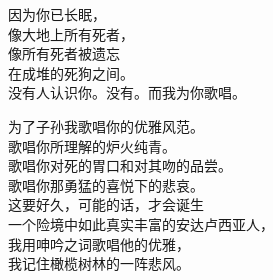 \documentclass{article}
\begin{document}
\begin{center}
\begin{minipage}{0.5\linewidth}
因为你已长眠， \\
像大地上所有死者， \\
像所有死者被遗忘 \\
在成堆的死狗之间。 \\

没有人认识你。没有。而我为你歌唱。 \\

\end{minipage}

\newpage

\begin{minipage}{0.5\linewidth}

\Large

为了子孙我歌唱你的优雅风范。 \\
歌唱你所理解的炉火纯青。 \\
歌唱你对死的胃口和对其吻的品尝。 \\
歌唱你那勇猛的喜悦下的悲哀。 \\

这要好久，可能的话，才会诞生 \\
一个险境中如此真实丰富的安达卢西亚人， \\
我用呻吟之词歌唱他的优雅， \\
我记住橄榄树林的一阵悲风。\end{minipage}

\end{center}
\end{document}
